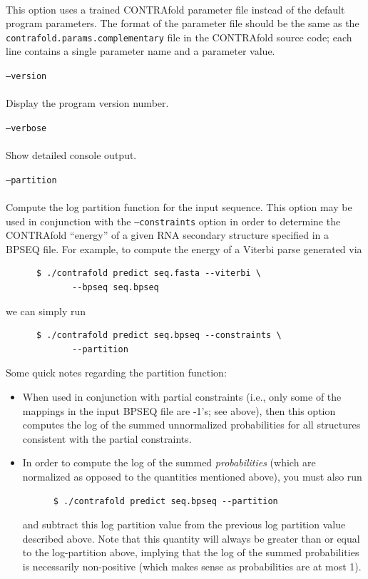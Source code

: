 \documentclass{article}
\begin{document}
\begin{description}
    \\
    This option uses a trained CONTRAfold parameter file instead of the
    default program parameters.  The format of the parameter file should
    be the same as the \texttt{contrafold.params.complementary} file in the CONTRAfold
    source code; each line contains a single parameter name and a parameter
    value.
  \item \texttt{--version} \\
    \\
    Display the program version number.
  \item \texttt{--verbose} \\
    \\
    Show detailed console output.
  \item \texttt{--partition} \\
    \\
    Compute the log partition function for the input sequence.  This option
    may be used in conjunction with the \texttt{--constraints} option in order
    to determine the CONTRAfold ``energy'' of a given RNA secondary structure
    specified in a BPSEQ file.  For example, to compute the energy of a
    Viterbi parse generated via
    \begin{verbatim}
      $ ./contrafold predict seq.fasta --viterbi \
             --bpseq seq.bpseq\end{verbatim}
    we can simply run
    \begin{verbatim}
      $ ./contrafold predict seq.bpseq --constraints \
             --partition\end{verbatim}
    Some quick notes regarding the partition function:
    \begin{itemize}
    \item 
      When used in conjunction with partial constraints (i.e., only some of the
      mappings in the input BPSEQ file are -1's; see above), then this option
      computes the log of the summed unnormalized probabilities for all structures consistent
      with the partial constraints.
    \item
      In order to compute the log of the summed \emph{probabilities} (which are
      normalized as opposed to the quantities mentioned above), you must also
      run
      \begin{verbatim}
      $ ./contrafold predict seq.bpseq --partition\end{verbatim}
      and subtract this log partition value from the previous log partition 
      value described above.  Note that this quantity will always be greater than
      or equal to the log-partition above, implying that the log of the summed
      probabilities is necessarily non-positive (which makes sense as probabilities
      are at most 1).
    \end{itemize}      
  \end{description}
  
\end{document}
